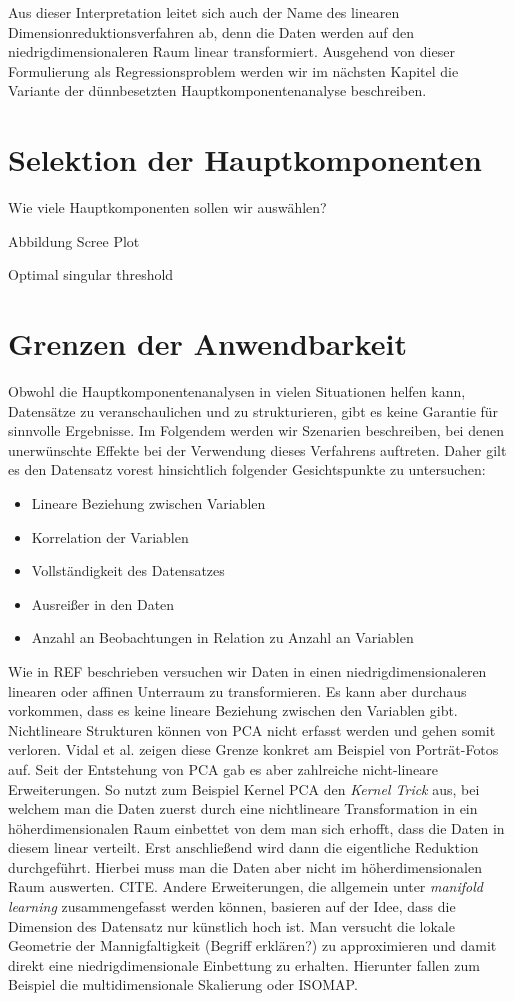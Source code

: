 Aus dieser Interpretation leitet sich auch der Name des linearen Dimensionreduktionsverfahren ab, denn die Daten werden auf den niedrigdimensionaleren Raum linear transformiert. Ausgehend von dieser Formulierung als Regressionsproblem werden wir im nächsten Kapitel die Variante der dünnbesetzten Hauptkomponentenanalyse beschreiben.


\section{Selektion der Hauptkomponenten}
Wie viele Hauptkomponenten sollen wir auswählen?

Abbildung Scree Plot

Optimal singular threshold \cite{gavish}

\section{Grenzen der Anwendbarkeit} \label{theo_results}

Obwohl die Hauptkomponentenanalysen in vielen Situationen helfen kann, Datensätze zu veranschaulichen und zu strukturieren, gibt es keine Garantie für sinnvolle Ergebnisse. Im Folgendem werden wir Szenarien beschreiben, bei denen unerwünschte Effekte bei der Verwendung dieses Verfahrens auftreten. Daher gilt es den Datensatz vorest hinsichtlich folgender Gesichtspunkte zu untersuchen: 

\begin{itemize}
\item Lineare Beziehung zwischen Variablen
\item Korrelation der Variablen
\item Vollständigkeit des Datensatzes
\item Ausreißer in den Daten
\item Anzahl an Beobachtungen in Relation zu Anzahl an Variablen
\end{itemize}

Wie in REF beschrieben versuchen wir Daten in einen niedrigdimensionaleren linearen oder affinen Unterraum zu transformieren. Es kann aber durchaus vorkommen, dass es keine lineare Beziehung zwischen den Variablen gibt. Nichtlineare Strukturen können von PCA nicht erfasst werden und gehen somit verloren. \cite{vidal} Vidal et al. zeigen diese Grenze konkret am Beispiel von Porträt-Fotos auf. Seit der Entstehung von PCA gab es aber zahlreiche nicht-lineare Erweiterungen. So nutzt zum Beispiel Kernel PCA den \textit{Kernel Trick} aus, bei welchem man die Daten zuerst durch eine nichtlineare Transformation in ein höherdimensionalen Raum einbettet von dem man sich erhofft, dass die Daten in diesem linear verteilt. Erst anschließend wird dann die eigentliche Reduktion durchgeführt. Hierbei muss man die Daten aber nicht im höherdimensionalen Raum auswerten. CITE. Andere Erweiterungen, die allgemein unter \textit{manifold learning} zusammengefasst werden können, basieren auf der Idee, dass die Dimension des Datensatz nur künstlich hoch ist. Man versucht die lokale Geometrie der Mannigfaltigkeit (Begriff erklären?) zu approximieren und damit direkt eine niedrigdimensionale Einbettung zu erhalten. Hierunter fallen zum Beispiel die multidimensionale Skalierung oder ISOMAP.

